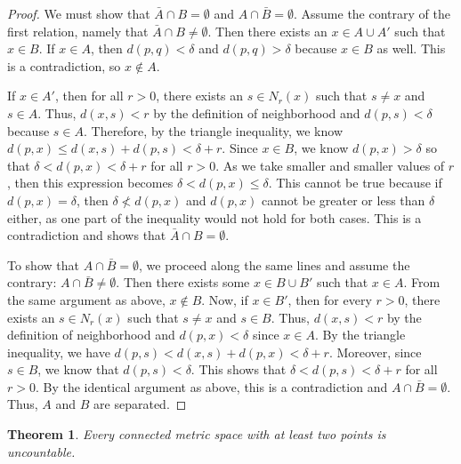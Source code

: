 \documentclass[psamsfonts]{amsart}
\newtheorem{thm}{Theorem}[section]
\theoremstyle{definition}
\theoremstyle{remark}
\numberwithin{equation}{section}
\begin{document}
\begin{proof}
We must show that $\bar{A} \cap B = \emptyset$ and $A \cap \bar{B} = \emptyset$. Assume the contrary of the first relation, namely that $\bar{A} \cap B \neq \emptyset$. Then there exists an $x \in A \cup A'$ such that $x \in B$. If $x \in A$, then $d(p,q) < \delta$ and $d(p,q) > \delta$ because $x \in B$ as well. This is a contradiction, so $x \notin A$. 

If $x \in A'$, then for all $r>0$, there exists an $s \in N_r(x)$ such that $s \neq x$ and $s \in A$. Thus, $d(x,s) < r$ by the definition of neighborhood and $d(p,s) < \delta$ because $s \in A$. Therefore, by the triangle inequality, we know $d(p,x) \leq d(x,s) + d(p,s) < \delta + r$. Since $x \in B$, we know $d(p,x) > \delta$ so that $ \delta < d(p,x) < \delta + r$ for all $r>0$. As we take smaller and smaller values of $r$, then this expression becomes $\delta < d(p,x) \leq \delta$. This cannot be true because if $d(p,x) = \delta$, then $\delta \nless d(p,x)$ and $d(p,x)$ cannot be greater or less than $\delta$ either, as one part of the inequality would not hold for both cases. This is a contradiction and shows that $\bar{A} \cap B = \emptyset$.   

To show that $A \cap \bar{B} = \emptyset$, we proceed along the same lines and assume the contrary: $A \cap \bar{B} \neq \emptyset$. Then there exists some $x \in B \cup B'$ such that $x \in A$. From the same argument as above, $x \notin B$. Now, if $x \in B'$, then for every $r>0$, there exists an $s \in N_r(x)$ such that $s \neq x$ and $s \in B$. Thus, $d(x,s) < r$ by the definition of neighborhood and $d(p,x) < \delta$ since $x \in A$. By the triangle inequality, we have $d(p,s) < d(x,s) + d(p,x) < \delta + r$. Moreover, since $s \in B$, we know that $d(p,s) < \delta$. This shows that $ \delta < d(p,s) < \delta + r$ for all $r > 0$. By the identical argument as above, this is a contradiction and $A \cap \bar{B} = \emptyset$. Thus, $A$ and $B$ are separated. 
\end{proof}

\begin{thm}
Every connected metric space with at least two points is uncountable.
\end{thm}
\end{document}
